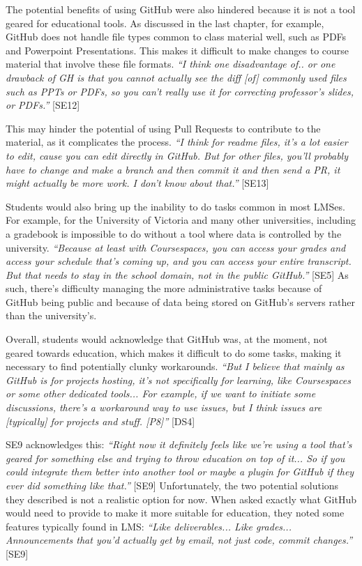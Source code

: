 The potential benefits of using GitHub were also hindered because it is not a tool geared for educational tools. As discussed in the last chapter, for example, GitHub does not handle file types common to class material well, such as PDFs and Powerpoint Presentations. This makes it difficult to make changes to course material that involve these file formats. \textit{``I think one disadvantage of.. or one drawback of GH is that you cannot actually see the diff [of] commonly used files such as PPTs or PDFs, so you can't really use it for correcting professor's slides, or PDFs.''} [SE12]

This may hinder the potential of using Pull Requests to contribute to the material, as it complicates the process. \textit{``I think for readme files, it's a lot easier to edit, cause you can edit directly in GitHub. But for other files, you'll probably have to change and make a branch and then commit it and then send a PR, it might actually be more work. I don't know about that.''} [SE13]

Students would also bring up the inability to do tasks common in most LMSes. For example, for the University of Victoria and many other universities, including a gradebook is impossible to do without a tool where data is controlled by the university. \textit{``Because at least with Coursespaces, you can access your grades and access your schedule that's coming up, and you can access your entire transcript. But that needs to stay in the school domain, not in the public GitHub.''} [SE5] As such, there's difficulty managing the more administrative tasks because of GitHub being public and because of data being stored on GitHub's servers rather than the university's.

Overall, students would acknowledge that GitHub was, at the moment, not geared towards education, which makes it difficult to do some tasks, making it necessary to find potentially clunky workarounds. \textit{``But I believe that mainly as GitHub is for projects hosting, it's not specifically for learning, like Coursespaces or some other dedicated tools... For example, if we want to initiate some discussions, there's a workaround way to use issues, but I think issues are [typically] for projects and stuff. [P8]''} [DS4]

SE9 acknowledges this: \textit{``Right now it definitely feels like we're using a tool that's geared for something else and trying to throw education on top of it... So if you could integrate them better into another tool or maybe a plugin for GitHub if they ever did something like that.''} [SE9] Unfortunately, the two potential solutions they described is not a realistic option for now. When asked exactly what GitHub would need to provide to make it more suitable for education, they noted some features typically found in LMS: \textit{``Like deliverables... Like grades... Announcements that you'd actually get by email, not just code, commit changes.''} [SE9]

